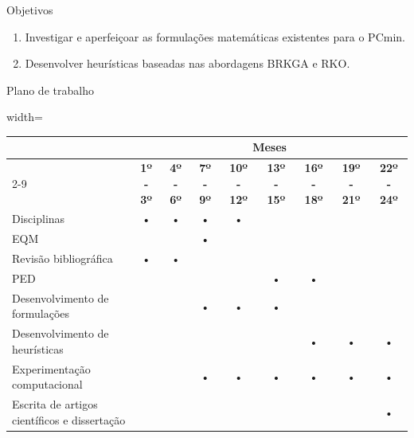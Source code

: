 \documentclass{beamer}
\begin{document}
\begin{frame}{Objetivos}
    
    \begin{enumerate}
        \item Investigar e aperfeiçoar as formulações matemáticas existentes para o PCmin.
        \pause
        \item Desenvolver heurísticas baseadas nas abordagens BRKGA e RKO.
    \end{enumerate}

\end{frame}

\begin{frame}{Plano de trabalho}
    \begin{table}
    \label{cronograma}
    \centering
    \begin{adjustbox}{width=\textwidth}
    \begin{tabular}{l ccc cccc c}
    \toprule
    & \multicolumn{8}{c}{\textbf{Meses}} \\
    \cmidrule{2-9}
    & \textbf{1º - 3º} & \textbf{4º - 6º} & \textbf{7º - 9º} & \textbf{10º - 12º} & \textbf{13º - 15º} & \textbf{16º - 18º} & \textbf{19º - 21º} & \textbf{22º - 24º} \\
    \midrule
    Disciplinas                   & • & • & • & • &   &   &   &   \\
    EQM                           &   &   & • &   &   &   &   &   \\
    Revisão bibliográfica        & • & • &   &   &   &   &   &   \\
    PED                           &   &   &  &  & • & • &   &   \\
    Desenvolvimento de formulações     &   &   & • & • & • &   &   &   \\
    Desenvolvimento de heurísticas&   &   &   &   &  & • & •  &  • \\
    Experimentação computacional  &   &   & • & • & • & • & • &  • \\
    Escrita de artigos científicos e dissertação        &   &   &   &   &   &   &   & • \\
    \bottomrule
    \end{tabular}
    \end{adjustbox}
    \end{table}
\end{frame}
\end{document}
